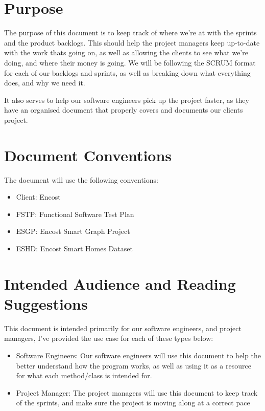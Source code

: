 \documentclass{scrreprt}
\begin{document}
% 
% 
\section{Purpose}

The purpose of this document is to keep track of where we're at with the sprints and the product backlogs. This should help the project managers keep up-to-date with the work thats going on, as well as allowing the clients to see what we're doing, and where their money is going. We will be following the SCRUM format for each of our backlogs and sprints, as well as breaking down what everything does, and why we need it.

It also serves to help our software engineers pick up the project faster, as they have an organised document that properly covers and documents our clients project.

% 
% 
\section{Document Conventions}

The document will use the following conventions:
\begin{itemize}
    \item Client: Encost
    \item FSTP: Functional Software Test Plan
    \item ESGP: Encost Smart Graph Project
    \item ESHD:  Encost Smart Homes Dataset
\end{itemize}

% 
% 
\section{Intended Audience and Reading Suggestions}

This document is intended primarily for our software engineers, and project managers, I've provided the use case for each of these types below:
\begin{itemize}
    \item Software Engineers: Our software engineers will use this document to help the better understand how the program works, as well as using it as a resource for what each method/class is intended for.  
    \item Project Manager: The project managers will use this document to keep track of the sprints, and make sure the project is moving along at a correct pace
\end{itemize}
\end{document}
